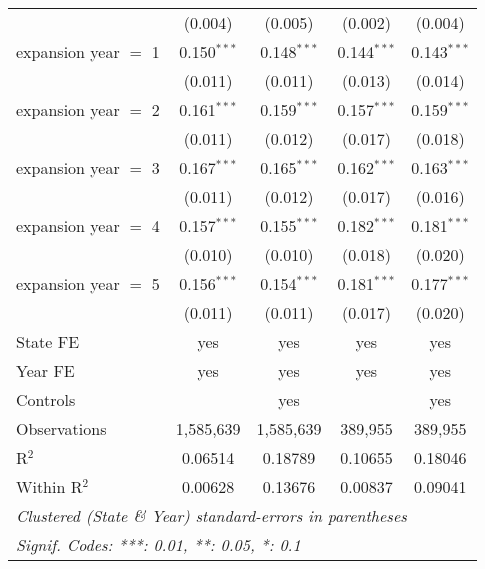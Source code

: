 \documentclass[
]{article}
\let\origtable\table
\let\endorigtable\endtable
\renewenvironment{table}[1][ht]{
      \expandafter\origtable\expandafter[H]
    }{
      \endorigtable
    }
\begin{document}
\begin{table}[htbp]
\begin{adjustbox}{width = 0.6\textwidth, center}
\begin{tabular}{lcccc}
                               & (0.004)       & (0.005)       & (0.002)        & (0.004)\\   
         expansion year $=$ 1  & 0.150$^{***}$ & 0.148$^{***}$ & 0.144$^{***}$  & 0.143$^{***}$\\   
                               & (0.011)       & (0.011)       & (0.013)        & (0.014)\\   
         expansion year $=$ 2  & 0.161$^{***}$ & 0.159$^{***}$ & 0.157$^{***}$  & 0.159$^{***}$\\   
                               & (0.011)       & (0.012)       & (0.017)        & (0.018)\\   
         expansion year $=$ 3  & 0.167$^{***}$ & 0.165$^{***}$ & 0.162$^{***}$  & 0.163$^{***}$\\   
                               & (0.011)       & (0.012)       & (0.017)        & (0.016)\\   
         expansion year $=$ 4  & 0.157$^{***}$ & 0.155$^{***}$ & 0.182$^{***}$  & 0.181$^{***}$\\   
                               & (0.010)       & (0.010)       & (0.018)        & (0.020)\\   
         expansion year $=$ 5  & 0.156$^{***}$ & 0.154$^{***}$ & 0.181$^{***}$  & 0.177$^{***}$\\   
                               & (0.011)       & (0.011)       & (0.017)        & (0.020)\\   
         State FE              & yes           & yes           & yes            & yes\\  
         Year FE               & yes           & yes           & yes            & yes\\  
         Controls              &               & yes           &                & yes\\  
         Observations          & 1,585,639     & 1,585,639     & 389,955        & 389,955\\  
         R$^2$                 & 0.06514       & 0.18789       & 0.10655        & 0.18046\\  
         Within R$^2$          & 0.00628       & 0.13676       & 0.00837        & 0.09041\\  
         \midrule \midrule
         \multicolumn{5}{l}{\emph{Clustered (State \& Year) standard-errors in parentheses}}\\
         \multicolumn{5}{l}{\emph{Signif. Codes: ***: 0.01, **: 0.05, *: 0.1}}\\
      \end{tabular}
   \end{adjustbox}
\end{table}
\end{document}
